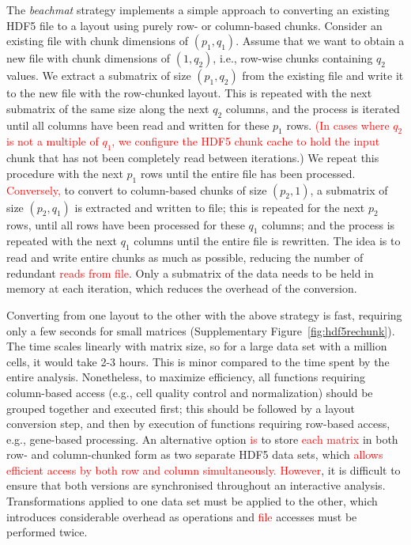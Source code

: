 \documentclass{article}
\newcommand{\beachmat}{\textit{beachmat}}
\newcommand{\revised}[1]{\textcolor{red}{#1}}
\begin{document}
The \beachmat{} strategy implements a simple approach to converting an existing HDF5 file to a layout using purely row- or column-based chunks.
Consider an existing file with chunk dimensions of $(p_1, q_1)$. 
Assume that we want to obtain a new file with chunk dimensions of $(1, q_2)$, i.e., row-wise chunks containing $q_2$ values.
We extract a submatrix of size $(p_1, q_2)$ from the existing file and write it to the new file with the row-chunked layout.
This is repeated with the next submatrix of the same size along the next $q_2$ columns, and the process is iterated until all columns have been read and written for these $p_1$ rows.
\revised{(In cases where $q_2$ is not a multiple of $q_1$, we configure the HDF5 chunk cache to hold the input} chunk that has not been completely read between iterations.)
We repeat this procedure with the next $p_1$ rows until the entire file has been processed.
\revised{Conversely,} to convert to column-based chunks of size $(p_2, 1)$, a submatrix of size $(p_2, q_1)$ is extracted and written to file; this is repeated for the next $p_2$ rows, until all rows have been processed for these $q_1$ columns; and the process is repeated with the next $q_1$ columns until the entire file is rewritten.
The idea is to read and write entire chunks as much as possible, reducing the number of redundant \revised{reads from file}.
Only a submatrix of the data needs to be held in memory at each iteration, which reduces the overhead of the conversion.

Converting from one layout to the other with the above strategy is fast, requiring only a few seconds for small matrices (Supplementary Figure~\ref{fig:hdf5rechunk}).
The time scales linearly with matrix size, so for a large data set with a million cells, it would take 2-3 hours.
This is minor compared to the time spent by the entire analysis.
Nonetheless, to maximize efficiency, all functions requiring column-based access (e.g., cell quality control and normalization) should be grouped together and executed first; 
this should be followed by a layout conversion step, and then by execution of functions requiring row-based access, e.g., gene-based processing.
An alternative option \revised{is} to store \revised{each matrix} in both row- and column-chunked form as two separate HDF5 data sets, which \revised{allows efficient access by both row and column simultaneously.}
\revised{However}, it is difficult to ensure that both versions are synchronised throughout an interactive analysis.
Transformations applied to one data set must be applied to the other, which introduces considerable overhead as operations and \revised{file} accesses must be performed twice.
\end{document}
